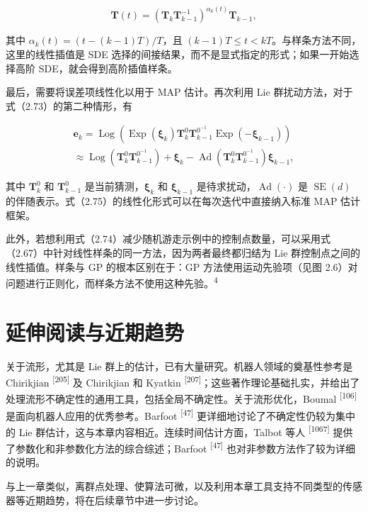 \begin{equation}
\pmb {T} (t) = \left(\pmb {T} _ {k} \pmb {T} _ {k - 1} ^ {- 1}\right) ^ {\alpha_ {k} (t)} \pmb {T} _ {k - 1},\tag{2.74}
\end{equation}

其中 $\alpha_k(t)=(t-(k-1)T)/T$，且 $(k-1)T\le t<kT$。与样条方法不同，这里的线性插值是 SDE 选择的间接结果，而不是显式指定的形式；如果一开始选择高阶 SDE，就会得到高阶插值样条。

最后，需要将误差项线性化以用于 MAP 估计。再次利用 Lie 群扰动方法，对于式（2.73）的第二种情形，有

\begin{equation}
\begin{array}{c} \boldsymbol {e} _ {k} = \operatorname{Log} \left(\operatorname{Exp} (\boldsymbol {\xi} _ {k}) \boldsymbol {T} _ {k} ^ {0} \boldsymbol {T} _ {k - 1} ^ {0^{-1}} \operatorname{Exp} (- \boldsymbol {\xi} _ {k - 1})\right) \\ \approx \operatorname{Log} \left(\boldsymbol {T} _ {k} ^ {0} \boldsymbol {T} _ {k - 1} ^ {0^{-1}}\right) + \boldsymbol {\xi} _ {k} - \operatorname{Ad} \left(\boldsymbol {T} _ {k} ^ {0} \boldsymbol {T} _ {k - 1} ^ {0^{-1}}\right) \boldsymbol {\xi} _ {k - 1}, \end{array}\tag{2.75}
\end{equation}

其中 $\pmb T_k^0$ 和 $\pmb T_{k-1}^0$ 是当前猜测，$\pmb\xi_k$ 和 $\pmb\xi_{k-1}$ 是待求扰动，$\operatorname{Ad}(\cdot)$ 是 $\operatorname{SE}(d)$ 的伴随表示。式（2.75）的线性化形式可以在每次迭代中直接纳入标准 MAP 估计框架。

此外，若想利用式（2.74）减少随机游走示例中的控制点数量，可以采用式（2.67）中针对线性样条的同一方法，因为两者最终都归结为 Lie 群控制点之间的线性插值。样条与 GP 的根本区别在于：GP 方法使用运动先验项（见图 2.6）对问题进行正则化，而样条方法不使用这种先验。\textsuperscript{4}

\section{延伸阅读与近期趋势}

关于流形，尤其是 Lie 群上的估计，已有大量研究。机器人领域的奠基性参考是 Chirikjian \textsuperscript{[205]} 及 Chirikjian 和 Kyatkin \textsuperscript{[207]}；这些著作理论基础扎实，并给出了处理流形不确定性的通用工具，包括全局不确定性。关于流形优化，Boumal \textsuperscript{[106]} 是面向机器人应用的优秀参考。Barfoot \textsuperscript{[47]} 更详细地讨论了不确定性仍较为集中的 Lie 群估计，这与本章内容相近。连续时间估计方面，Talbot 等人 \textsuperscript{[1067]} 提供了参数化和非参数化方法的综合综述；Barfoot \textsuperscript{[47]} 也对非参数方法作了较为详细的说明。

与上一章类似，离群点处理、使算法可微，以及利用本章工具支持不同类型的传感器等近期趋势，将在后续章节中进一步讨论。
